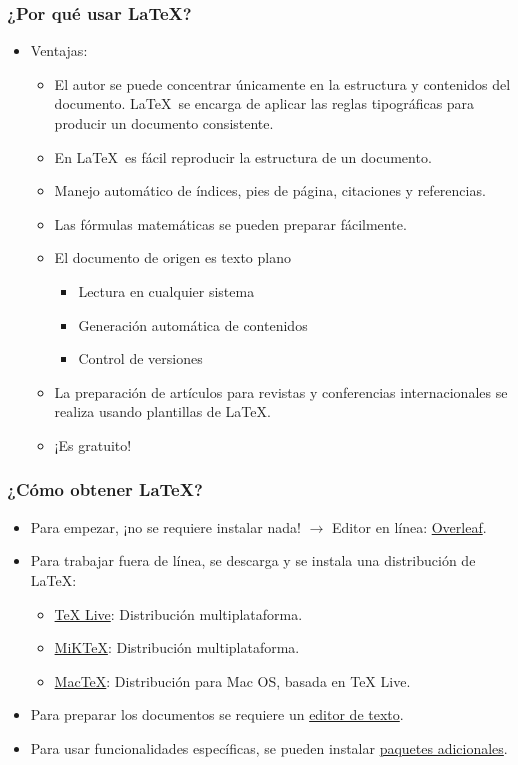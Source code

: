 \documentclass[aspectratio=169]{beamer}
\begin{document}
\begin{frame}[t]\frametitle{¿Por qué usar \LaTeX?}
	\begin{itemize}
		\item Ventajas:
		\begin{itemize}
			\item El autor se puede concentrar únicamente en la estructura y contenidos del documento. \LaTeX\ se encarga de aplicar las reglas tipográficas para producir un documento consistente.
			\item En \LaTeX\ es fácil reproducir la estructura de un documento.
			\item Manejo automático de índices, pies de página, citaciones y referencias.
			\item Las fórmulas matemáticas se pueden preparar fácilmente.
			\item El documento de origen es texto plano
			\begin{itemize}
			 	\item Lectura en cualquier sistema
			 	\item Generación automática de contenidos
			 	\item Control de versiones
			 \end{itemize}
			\item La preparación de artículos para revistas y conferencias internacionales se realiza usando plantillas de \LaTeX.
			\item ¡Es gratuito!
		\end{itemize}
	\end{itemize}
\end{frame}

\begin{frame}[t]\frametitle{¿Cómo obtener \LaTeX?}
	\begin{itemize}
		\item Para empezar, ¡no se requiere instalar nada! $\longrightarrow$ Editor en línea: \href{https://www.overleaf.com}{Overleaf}.
		\item Para trabajar fuera de línea, se descarga y se instala una distribución de \LaTeX:
		\begin{itemize}
			\item \href{http://www.tug.org/texlive/}{TeX Live}: Distribución multiplataforma.
			\item \href{http://www.miktex.org/}{MiKTeX}: Distribución multiplataforma.
			\item \href{http://www.tug.org/mactex/}{MacTeX}: Distribución para Mac OS, basada en TeX Live.
		\end{itemize}
		\item Para preparar los documentos se requiere un \href{https://en.wikipedia.org/wiki/Comparison_of_TeX_editors}{editor de texto}.
		\item Para usar funcionalidades específicas, se pueden instalar \href{https://www.ctan.org/}{paquetes adicionales}.
	\end{itemize}
\end{frame}
\end{document}
